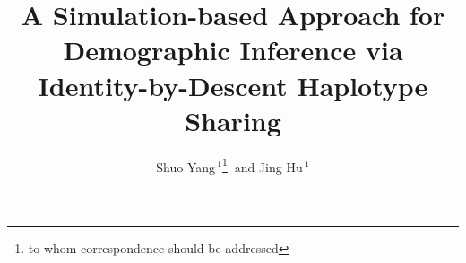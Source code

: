 \documentclass{bioinfo}
\begin{document}

\title[IBD statistics used in demographic inference]{A Simulation-based Approach for Demographic Inference via Identity-by-Descent Haplotype Sharing}
\author[Yang and Hu]{Shuo Yang\,$^{1}$\footnote{to whom correspondence should be addressed} $\ $and Jing Hu\,$^{1}$}
\address{$^{1}$Department of Computer Science, Columbia University, New York, NY 10027, USA}



\maketitle
\end{document}
